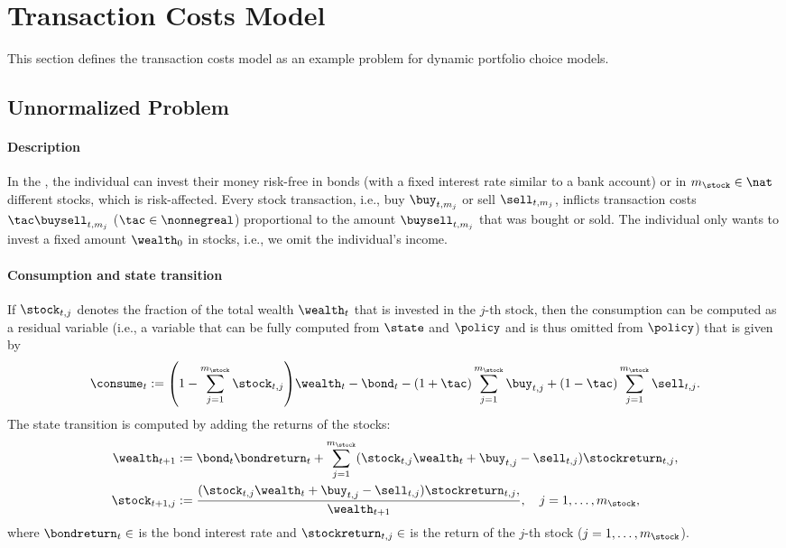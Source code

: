 \section{Transaction Costs Model}
\label{sec:83problem}


\noindent
This section defines the transaction costs model as an example problem for
dynamic portfolio choice models.



\subsection{Unnormalized Problem}
\label{sec:831unnormalized}

\paragraph{Description}

In the  \cite{Schober18Solving},
the individual can invest their money risk-free in bonds
(with a fixed interest rate similar to a bank account)
or in $m_{\stock} \in \nat$ different stocks, which is risk-affected.
Every stock transaction,
i.e., buy $\buy_{t,m_j}$ or sell $\sell_{t,m_j}$,
inflicts transaction costs $\tac \buysell_{t,m_j}$ ($\tac \in \nonnegreal$)
proportional to the amount $\buysell_{t,m_j}$ that was bought or sold.
The individual only wants to invest a fixed
amount $\wealth_0$ in stocks, i.e., we omit the individual's income.

\paragraph{Consumption and state transition}

If $\stock_{t,j}$ denotes the fraction of the total wealth $\wealth_t$
that is invested in the $j$-th stock,
then the consumption can be computed as a residual variable
(i.e., a variable that can be fully computed from $\state$ and $\policy$
and is thus omitted from $\policy$)
that is given by
\begin{equation}
  \consume_t
  := \paren*{1 - \sum_{j=1}^{m_{\stock}} \stock_{t,j}} \wealth_t - \bond_t -
  (1 + \tac) \sum_{j=1}^{m_{\stock}} \buy_{t,j} +
  (1 - \tac) \sum_{j=1}^{m_{\stock}} \sell_{t,j}.
\end{equation}
The state transition is computed by adding the returns of the stocks:
\begin{subequations}
  \begin{align}
    \wealth_{t+1}
    &:= \bond_t \bondreturn_t + \sum_{j=1}^{m_{\stock}}
    (\stock_{t,j} \wealth_t + \buy_{t,j} - \sell_{t,j}) \stockreturn_{t,j},\\
    \stock_{t+1,j}
    &:= \frac{
      (\stock_{t,j} \wealth_t + \buy_{t,j} - \sell_{t,j}) \stockreturn_{t,j},
    }{\wealth_{t+1}},\quad
    j = 1, \dotsc, m_{\stock},
  \end{align}
\end{subequations}
where $\bondreturn_t \in \real$ is the bond interest rate and
$\stockreturn_{t,j} \in \real$ is the return of the $j$-th stock
($j = 1, \dotsc, m_{\stock}$).



